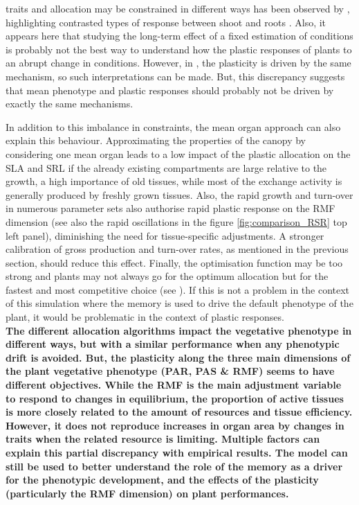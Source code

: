traits and allocation may be constrained in different ways has been observed by \citet{freschet_integrated_2015}, highlighting contrasted types of response between shoot and roots \parencite{poorter_limits_2015}. Also, it appears here that studying the long-term effect of a fixed estimation of conditions is probably not the best way to understand how the plastic responses of plants to an abrupt change in conditions. However, in \model, the plasticity is driven by the same mechanism, so such interpretations can be made. But, this discrepancy suggests that mean phenotype and plastic responses should probably not be driven by exactly the same mechanisms.

In addition to this imbalance in constraints, the mean organ approach can also explain this behaviour. Approximating the properties of the canopy by considering one mean organ leads to a low impact of the plastic allocation on the SLA and SRL if the already existing compartments are large relative to the growth, a high importance of old tissues, while most of the exchange activity is generally produced by freshly grown tissues. Also, the rapid growth and turn-over in numerous parameter sets also authorise rapid plastic response on the RMF dimension (see also the rapid oscillations in the figure \ref{fig:comparison_RSR} top left panel), diminishing the need for tissue-specific adjustments. A stronger calibration of gross production and turn-over rates, as mentioned in the previous section, should reduce this effect. Finally, the optimisation function may be too strong and plants may not always go for the optimum allocation but for the fastest and most competitive choice (see \citet{farrior_resource_2011,dybzinski_evolutionarily_2011, farrior_competitive_2014}). If this is not a problem in the context of this simulation where the memory is used to drive the default phenotype of the plant, it would be problematic in the context of plastic responses.\\


\textbf{The different allocation algorithms impact the vegetative phenotype in different ways, but with a similar performance when any phenotypic drift is avoided. But, the plasticity along the three main dimensions of the plant vegetative phenotype (PAR, PAS \& RMF) seems to have different objectives. While the RMF is the main adjustment variable to respond to changes in equilibrium, the proportion of active tissues is more closely related to the amount of resources and tissue efficiency.  However, it does not reproduce increases in organ area by changes in traits when the related resource is limiting. Multiple factors can explain this partial discrepancy with empirical results. The model can still be used to better understand the role of the memory as a driver for the phenotypic development, and the effects of the plasticity (particularly the RMF dimension) on plant performances.}

